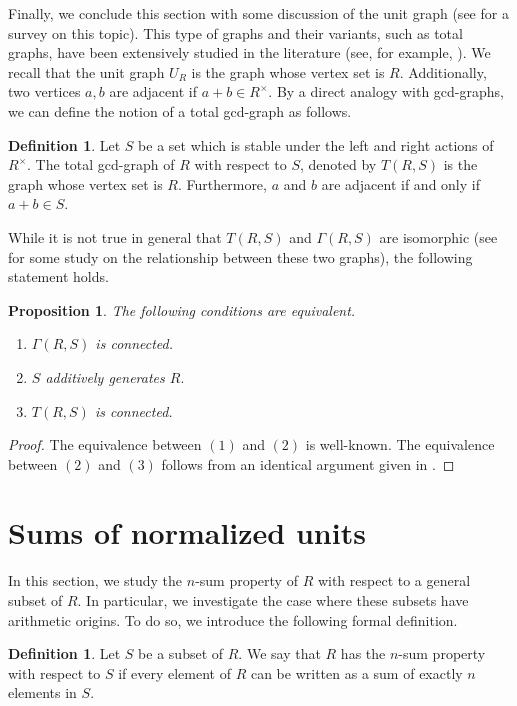 \documentclass[11pt, a4paper]{amsart}
\newtheorem{prop}[thm]{Proposition}
\theoremstyle{definition}
\newtheorem{definition}[thm]{Definition}
\numberwithin{equation}{section}
\begin{document}
Finally, we conclude this section with some discussion of the unit graph (see \cite{MR1041619} for a survey on this topic). This type of graphs and their variants, such as total graphs, have been extensively studied in the literature (see, for example, \cite{anderson2008total, Ashrafi2010}). We recall that the unit graph $U_{R}$ is the graph whose vertex set is $R$. Additionally, two vertices $a,b$ are adjacent if $a+b \in R^{\times}.$ By a direct analogy with gcd-graphs, we can define the notion of a total gcd-graph as follows. 

\begin{definition}
    Let $S$ be a set which is stable under the left and right actions of $R^{\times}.$ The total gcd-graph of $R$ with respect to $S$, denoted by $T(R,S)$ is the graph whose vertex set is $R$. Furthermore, $a$ and $b$ are adjacent if and only if $a+b \in S.$
\end{definition}

While it is not true in general that $T(R,S)$ and $\Gamma(R,S)$ are isomorphic (see \cite{Huadong, shekarriz2012total} for some study on the relationship between these two graphs), the following statement holds. 

\begin{prop} 
The following conditions are equivalent. 
\begin{enumerate}
\item  $\Gamma(R,S)$ is connected. 
\item $S$ additively generates $R.$
\item $T(R,S)$ is connected. 
\end{enumerate}


\end{prop}


\begin{proof}
    The equivalence between $(1)$ and $(2)$ is well-known. The equivalence between $(2)$ and $(3)$ follows from an identical argument given in \cite[Theorem 4.1]{Alluqmani2026}. 
\end{proof}
\section{Sums of normalized units} \label{sec:normalized_units}
In this section, we study the $n$-sum property of $R$ with respect to a general subset of $R.$ In particular, we investigate the case where these subsets have arithmetic origins. To do so, we introduce the following formal definition.

\begin{definition}
    Let $S$ be a subset of $R.$ We say that $R$ has the $n$-sum property with respect to $S$ if every element of $R$ can be written as a sum of exactly $n$ elements in $S.$
\end{definition}
\end{document}
